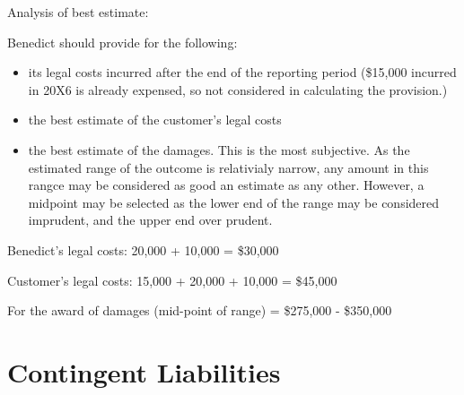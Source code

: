 Analysis of best estimate:

Benedict should provide for the following: 

\begin{itemize}
    \item its legal costs incurred after the end of the reporting period (\$15,000 incurred in 20X6 is already expensed, so not considered in calculating the provision.)
    \item the best estimate of the customer's legal costs 
    \item the best estimate of the damages. This is the most subjective. As the estimated range of the outcome is relativialy narrow, any amount in this rangce may be considered as good an estimate as any other. However, a midpoint may be selected as the lower end of the range may be considered imprudent, and the upper end over prudent. 
\end{itemize}


Benedict's legal costs: 20,000 + 10,000 = \$30,000

Customer's legal costs: 15,000 + 20,000 + 10,000 = \$45,000

For the award of damages (mid-point of range) = \$275,000 - \$350,000

\section{Contingent Liabilities}



